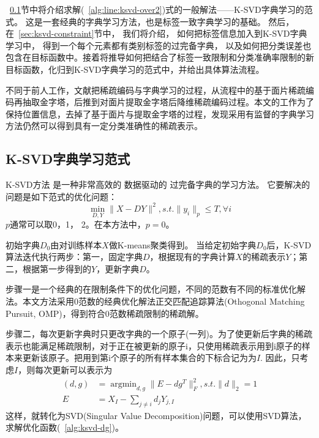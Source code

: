     ~\ref{sec:lsvd-lasso}节中将介绍求解(~\ref{alg:line:ksvd-over2})式的一般解法——K-SVD字典学习的范式。 这是一套经典的字典学习方法，也是标签一致字典学习的基础。 然后， 在~\ref{sec:ksvd-constraint}节中，  我们将介绍， 如何把标签信息加入到K-SVD字典学习中，  得到一个每个元素都有类别标签的过完备字典\cite{jiang2013label}， 以及如何把分类误差也包含在目标函数中。接着将推导如何把结合了标签一致限制和分类准确率限制的新目标函数，化归到K-SVD字典学习的范式中，并给出具体算法流程。

    不同于前人工作\cite{yang2009linear}，文献把稀疏编码与字典学习的过程，从流程中的基于面片稀疏编码再抽取金字塔，后推到对面片提取金字塔后降维稀疏编码过程。本文的工作为了保持位置信息，去掉了基于面片与提取金字塔的过程，发现采用有监督的字典学习方法仍然可以得到具有一定分类准确性的稀疏表示。


    \subsection{K-SVD字典学习范式} 
    \label{sec:lsvd-lasso}
    K-SVD方法 \cite{aharon2006rm}是一种非常高效的 数据驱动的 过完备字典的学习方法。  它要解决的问题是如下范式的优化问题：
    \begin{equation}
    \label{alg:ksvd-lasso}
        \min _{D, Y} \| X - DY \| ^2 , s.t. \| y_i \| _p \le T, \forall i
    \end{equation}
    $p$通常可以取0，1， 2。在本方法中，$p = 0$。

    初始字典$D_0$由对训练样本$X$做K-means\cite{kanungo2002efficient}聚类得到。
    当给定初始字典$D_0$后，K-SVD算法迭代执行两步：第一，固定字典$D$，根据现有的字典计算$X$的稀疏表示$Y$；第二，根据第一步得到的$Y$，更新字典$D$。

    步骤一是一个经典的在限制条件下的优化问题，不同的范数有不同的标准优化解法。本文方法采用0范数的经典优化解法正交匹配追踪算法(Othogonal Matching Pursuit, OMP)\cite{pati1993orthogonal}，得到符合0范数稀疏限制的稀疏解。

    步骤二，每次更新字典时只更改字典的一个原子(一列)。为了使更新后字典的稀疏表示也能满足稀疏限制，对于正在被更新的原子i，只使用稀疏表示用到i原子的样本来更新该原子。把用到第i个原子的所有样本集合的下标合记为为$I$. 因此，只考虑$I$，则每次更新可以表示为
    \begin{equation}
    \label{alg:ksvd-dg}
    \begin{split}
    (d, g) &= \mathop{\arg \min}_{d, g}\|E - d g^T\| ^2 _F, s.t.\|d\|_ 2 = 1 \\
    E &= X_I - \sum _{j\ne i} d_j Y_{j, I}
    \end{split}
    \end{equation}
    这样，就转化为SVD(Singular Value Decomposition)问题，可以使用SVD算法，求解优化函数(~\ref{alg:ksvd-dg})。

